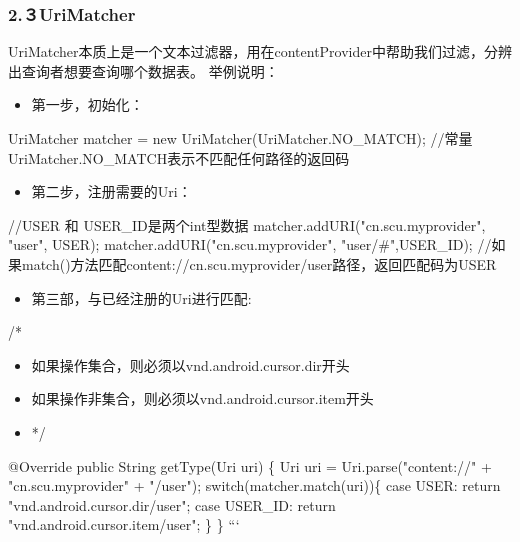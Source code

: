 \documentclass[9pt, b5paper]{article}
\begin{document}
\subsubsection{2.３UriMatcher}
\label{sec-14-2-3}
UriMatcher本质上是一个文本过滤器，用在contentProvider中帮助我们过滤，分辨出查询者想要查询哪个数据表。
举例说明：
\begin{itemize}
\item 第一步，初始化：
\end{itemize}
UriMatcher matcher = new UriMatcher(UriMatcher.NO\_MATCH);
//常量UriMatcher.NO\_MATCH表示不匹配任何路径的返回码
\begin{itemize}
\item 第二步，注册需要的Uri：
\end{itemize}
//USER 和 USER\_ID是两个int型数据
matcher.addURI("cn.scu.myprovider", "user", USER);
matcher.addURI("cn.scu.myprovider", "user/\#",USER\_ID);
//如果match()方法匹配content://cn.scu.myprovider/user路径，返回匹配码为USER
\begin{itemize}
\item 第三部，与已经注册的Uri进行匹配:
\end{itemize}
/* 
\begin{itemize}
\item 如果操作集合，则必须以vnd.android.cursor.dir开头
\item 如果操作非集合，则必须以vnd.android.cursor.item开头
\item */
\end{itemize}
    @Override  
    public String getType(Uri uri) \{  
    Uri uri = Uri.parse("content://" + "cn.scu.myprovider" + "/user");  
        switch(matcher.match(uri))\{  
        case USER:  
            return "vnd.android.cursor.dir/user";  
        case USER\_ID:  
            return "vnd.android.cursor.item/user";  
        \}  
    \} 
``` 
\end{document}
